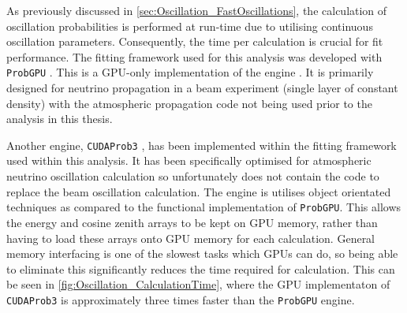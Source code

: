 As previously discussed in \autoref{sec:Oscillation_FastOscillations}, the calculation of oscillation probabilities is performed at run-time due to utilising continuous oscillation parameters. Consequently, the time per calculation is crucial for fit performance. The fitting framework used for this analysis was developed with \texttt{ProbGPU} \cite{probgpu}. This is a GPU-only implementation of the  engine \cite{Prob3}. It is primarily designed for neutrino propagation in a beam experiment (single layer of constant density) with the atmospheric propagation code not being used prior to the analysis in this thesis.

Another engine, \texttt{CUDAProb3} \cite{cudaprob3}, has been implemented within the fitting framework used within this analysis. It has been specifically optimised for atmospheric neutrino oscillation calculation so unfortunately does not contain the code to replace the beam oscillation calculation. The engine is utilises object orientated techniques as compared to the functional implementation of \texttt{ProbGPU}. This allows the energy and cosine zenith arrays to be kept on GPU memory, rather than having to load these arrays onto GPU memory for each calculation. General memory interfacing is one of the slowest tasks which GPUs can do, so being able to eliminate this significantly reduces the time required for calculation. This can be seen in \autoref{fig:Oscillation_CalculationTime}, where the GPU implementaton of \texttt{CUDAProb3} is approximately three times faster than the \texttt{ProbGPU} engine.

